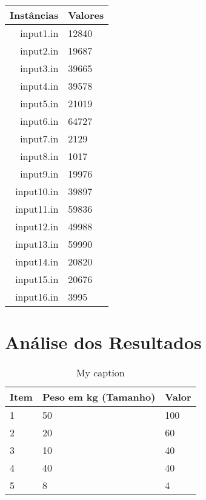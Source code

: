 \documentclass[a4paper, 12pt]{article}
\begin{document}
\begin{table}[h]
    \begin{tabular}{|r|l|}
        \hline
        \textbf{Instâncias} &  \textbf{Valores} \\ \hline
        input1.in  &    12840 \\ \hline
        input2.in  &    19687 \\ \hline
        input3.in  &    39665 \\ \hline 
        input4.in  &    39578 \\ \hline
        input5.in  &    21019 \\ \hline
        input6.in  &    64727 \\ \hline
        input7.in  &     2129 \\ \hline
        input8.in  &     1017 \\ \hline
        input9.in  &    19976 \\ \hline
        input10.in &    39897 \\ \hline
        input11.in &    59836 \\ \hline
        input12.in &    49988 \\ \hline
        input13.in &    59990 \\ \hline
        input14.in &    20820 \\ \hline
        input15.in &    20676 \\ \hline
        input16.in &     3995 \\ \hline
    \end{tabular}
\end{table}

\clearpage

\section{Análise dos Resultados}


\begin{table}[h]
\centering
\caption{My caption}
\label{my-label}  
\begin{adjustbox}{width=1\textwidth}  
    \centering
    \begin{tabular}{|l|l|l|}
    \hline
    Item & Peso em kg (Tamanho) & Valor\\ \hline
    1 & 50 & 100\\ \hline
    2 & 20 & 60\\ \hline
    3 & 10 & 40\\ \hline
    4 & 40 & 40\\ \hline
    5 & 8 & 4 \\ \hline
    \end{tabular}
\end{adjustbox}
\end{table}

\clearpage
\end{document}
